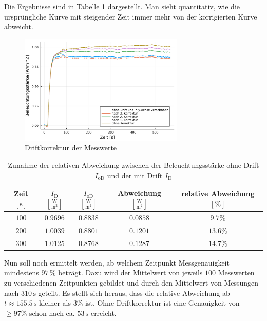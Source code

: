 \documentclass[12pt,a4paper]{scrartcl}
\numberwithin{equation}{section} %
\begin{document}
Die Ergebnisse sind in Tabelle \ref{tab:rel Abweichung} dargestellt. Man sieht quantitativ, wie die ursprüngliche Kurve mit steigender Zeit immer mehr von der korrigierten Kurve abweicht.

\begin{figure}[h!]
	\centering
	\includegraphics[width=0.7\textwidth]{../media/B1.1/Drift.pdf}
	\caption{Driftkorrektur der Messwerte}
	\label{abb:Driftkorrektur der Messwerte}
\end{figure}

\begin{table}[h!]
	\centering
	\begin{tabular}{c|c|c|c|c}
		Zeit $[\mathrm{s}]$
		& $I_\mathrm{D}$ $[\mathrm{\frac{W}{m^2}}]$
		& $I_\mathrm{oD}$ $[\mathrm{\frac{W}{m^2}}]$
		& Abweichung $[\mathrm{\frac{W}{m^2}}]$
		& relative Abweichung $[\%]$ \\
		\hline
		$100$ & $0.9696$ & $0.8838$ & $0.0858$ & $9.7\%$\\
		$200$ & $1.0039$ & $0.8801$ & $0.1201$ & $13.6\%$\\
		$300$ & $1.0125$ & $0.8768$ & $0.1287$ & $14.7\%$\\
	\end{tabular}
	\caption{Zunahme der relativen Abweichung zwischen der Beleuchtungsstärke ohne Drift $I_\mathrm{oD}$ und der mit Drift $I_\mathrm{D}$}
	\label{tab:rel Abweichung}
\end{table}

Nun soll noch ermittelt werden, ab welchem Zeitpunkt Messgenauigkeit mindestens $97\,\%$ beträgt. Dazu wird der Mittelwert von jeweils $100$ Messwerten zu verschiedenen Zeitpunkten gebildet und durch den Mittelwert von Messungen nach $310\mathrm{\,s}$ geteilt. Es stellt sich heraus, dass die relative Abweichung ab $t \approx 155.5\mathrm{\,s}$ kleiner als $3\%$ ist. Ohne Driftkorrektur ist eine Genauigkeit von $\geq 97\%$ schon nach ca. $53\mathrm{\,s}$ erreicht.
\end{document}

